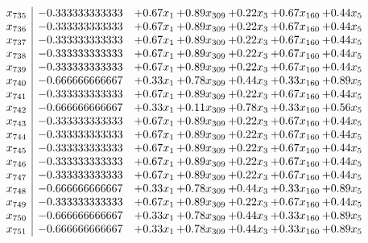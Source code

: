 \documentclass[8pt]{article}
\begin{document}
\[\begin{array}{c| c c@{\hskip 2pt} c@{\hskip 2pt} c@{\hskip 2pt} c@{\hskip 2pt} c@{\hskip 2pt} }
 x_{735}   &  -0.333333333333 & +  0.67 x_{1} & +  0.89 x_{309} & +  0.22 x_{3} & +  0.67 x_{160} & +  0.44 x_{5}\\
 x_{736}   &  -0.333333333333 & +  0.67 x_{1} & +  0.89 x_{309} & +  0.22 x_{3} & +  0.67 x_{160} & +  0.44 x_{5}\\
 x_{737}   &  -0.333333333333 & +  0.67 x_{1} & +  0.89 x_{309} & +  0.22 x_{3} & +  0.67 x_{160} & +  0.44 x_{5}\\
 x_{738}   &  -0.333333333333 & +  0.67 x_{1} & +  0.89 x_{309} & +  0.22 x_{3} & +  0.67 x_{160} & +  0.44 x_{5}\\
 x_{739}   &  -0.333333333333 & +  0.67 x_{1} & +  0.89 x_{309} & +  0.22 x_{3} & +  0.67 x_{160} & +  0.44 x_{5}\\
 x_{740}   &  -0.666666666667 & +  0.33 x_{1} & +  0.78 x_{309} & +  0.44 x_{3} & +  0.33 x_{160} & +  0.89 x_{5}\\
 x_{741}   &  -0.333333333333 & +  0.67 x_{1} & +  0.89 x_{309} & +  0.22 x_{3} & +  0.67 x_{160} & +  0.44 x_{5}\\
 x_{742}   &  -0.666666666667 & +  0.33 x_{1} & +  0.11 x_{309} & +  0.78 x_{3} & +  0.33 x_{160} & +  0.56 x_{5}\\
 x_{743}   &  -0.333333333333 & +  0.67 x_{1} & +  0.89 x_{309} & +  0.22 x_{3} & +  0.67 x_{160} & +  0.44 x_{5}\\
 x_{744}   &  -0.333333333333 & +  0.67 x_{1} & +  0.89 x_{309} & +  0.22 x_{3} & +  0.67 x_{160} & +  0.44 x_{5}\\
 x_{745}   &  -0.333333333333 & +  0.67 x_{1} & +  0.89 x_{309} & +  0.22 x_{3} & +  0.67 x_{160} & +  0.44 x_{5}\\
 x_{746}   &  -0.333333333333 & +  0.67 x_{1} & +  0.89 x_{309} & +  0.22 x_{3} & +  0.67 x_{160} & +  0.44 x_{5}\\
 x_{747}   &  -0.333333333333 & +  0.67 x_{1} & +  0.89 x_{309} & +  0.22 x_{3} & +  0.67 x_{160} & +  0.44 x_{5}\\
 x_{748}   &  -0.666666666667 & +  0.33 x_{1} & +  0.78 x_{309} & +  0.44 x_{3} & +  0.33 x_{160} & +  0.89 x_{5}\\
 x_{749}   &  -0.333333333333 & +  0.67 x_{1} & +  0.89 x_{309} & +  0.22 x_{3} & +  0.67 x_{160} & +  0.44 x_{5}\\
 x_{750}   &  -0.666666666667 & +  0.33 x_{1} & +  0.78 x_{309} & +  0.44 x_{3} & +  0.33 x_{160} & +  0.89 x_{5}\\
 x_{751}   &  -0.666666666667 & +  0.33 x_{1} & +  0.78 x_{309} & +  0.44 x_{3} & +  0.33 x_{160} & +  0.89 x_{5}\\

\end{array}\]
\end{document}
